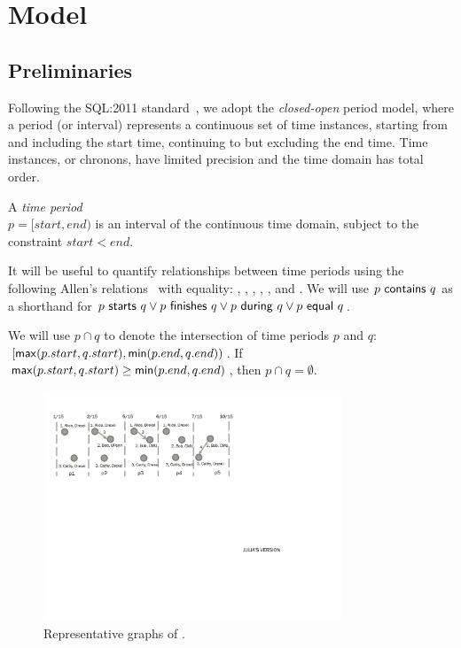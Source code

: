\section{Model}
\label{sec:model}

\subsection{Preliminaries}
\label{sec:model:prelim}

Following the SQL:2011
standard~\cite{DBLP:journals/sigmod/KulkarniM12}, we adopt the {\em
  closed-open} period model, where a period (or interval) represents a
continuous set of time instances, starting from and including the
start time, continuing to but excluding the end time.  Time instances,
or chronons, have limited precision and the time domain has total
order.

\begin{definition}
A {\em time period} \\$p = [start, end)$ is an interval of the
  continuous time domain, subject to the constraint $start < end$.
\label{def:period} 
\end{definition}

It will be useful to quantify relationships between time periods using
the following Allen's relations~\cite{allen83} with equality:
, , ,
, , and .  We
will use $p~\mathsf{contains}~q$ as a shorthand for
$p~\mathsf{starts}~q \vee p~\mathsf{finishes}~q \vee
p~\mathsf{during}~q \vee p~\mathsf{equal}~q$.

We will use $p \cap q$ to denote the intersection of time periods $p$
and $q$: $[\mathsf{max}(p.start,q.start), \mathsf{min}(p.end,
  q.end))$.  If $\mathsf{max}(p.start,q.start) \geq
  \mathsf{min}(p.end, q.end)$, then $p \cap q = \emptyset$.

\begin{figure}
\centering
\includegraphics[width=3.5in]{figs/T1_graphs.pdf}
\caption{Representative graphs of \tg {}.}
\label{fig:tg_rg}
\end{figure}

